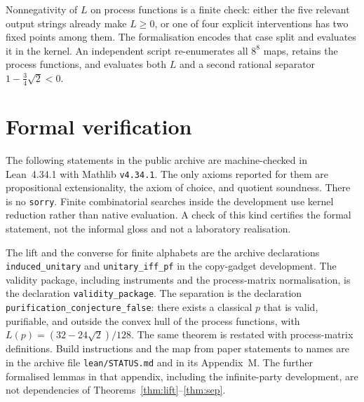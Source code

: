 \documentclass[11pt]{article}
\theoremstyle{definition}
\theoremstyle{remark}
\begin{document}
Nonnegativity of \(L\) on process functions is a finite check: either the five relevant output strings already make \(L\ge 0\), or one of four explicit interventions has two fixed points among them. The formalisation encodes that case split and evaluates it in the kernel. An independent script re-enumerates all \(8^8\) maps, retains the process functions, and evaluates both \(L\) and a second rational separator \(1-\tfrac34\sqrt{2}<0\).

\section{Formal verification}
\label{app:lean}

The following statements in the public archive are machine-checked in Lean~4.34.1 with Mathlib \texttt{v4.34.1}. The only axioms reported for them are propositional extensionality, the axiom of choice, and quotient soundness. There is no \texttt{sorry}. Finite combinatorial searches inside the development use kernel reduction rather than native evaluation. A check of this kind certifies the formal statement, not the informal gloss and not a laboratory realisation.

The lift and the converse for finite alphabets are the archive declarations \texttt{induced\_unitary} and \texttt{unitary\_iff\_pf} in the copy-gadget development. The validity package, including instruments and the process-matrix normalisation, is the declaration \texttt{validity\_package}. The separation is the declaration \texttt{purification\_conjecture\_false}: there exists a classical \(p\) that is valid, purifiable, and outside the convex hull of the process functions, with \(L(p)=(32-24\sqrt{2})/128\). The same theorem is restated with process-matrix definitions. Build instructions and the map from paper statements to names are in the archive file \texttt{lean/STATUS.md} and in its Appendix~M. The further formalised lemmas in that appendix, including the infinite-party development, are not dependencies of Theorems~\ref{thm:lift}--\ref{thm:sep}.
\end{document}
